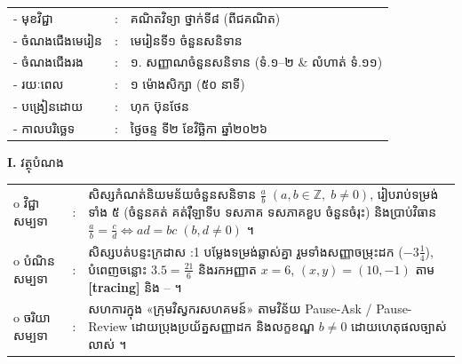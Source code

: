 \documentclass[a4paper,10pt]{article}
\newcommand{\wcirc}{{\CourierBullet\fontsize{9.5pt}{11pt}\selectfont o}}
\newcommand{\en}[1]{{\TimesEn #1}}
\newcommand{\cnum}[1]{\mbox{\fontsize{10.5pt}{12pt}\selectfont\ding{\numexpr181+#1\relax}}\hspace{0.15em}}
\begin{document}
{\renewcommand{\arraystretch}{1.06}
\hspace*{4.2cm}%
\begin{tabular}{@{}l l l@{}}
  - \hspace{0.35cm} មុខវិជ្ជា & : & គណិតវិទ្យា ថ្នាក់ទី៨ (ពីជគណិត) \\
  - \hspace{0.35cm} ចំណងជើងមេរៀន & : & មេរៀនទី១ ចំនួនសនិទាន \\
  - \hspace{0.35cm} ចំណងជើងរង & : & ១. សញ្ញាណចំនួនសនិទាន (ទំ.១--២ \& លំហាត់ ទំ.១១) \\
  - \hspace{0.35cm} រយៈពេល & : & ១ ម៉ោងសិក្សា (៥០ នាទី) \\
  - \hspace{0.35cm} បង្រៀនដោយ & : & ហុក ប៊ុនថែន \\
  - \hspace{0.35cm} កាលបរិច្ឆេទ & : & ថ្ងៃចន្ទ ទី២ ខែវិច្ឆិកា ឆ្នាំ២០២៦ \\
\end{tabular}

\vspace{2pt}

\textbf{I.} {\muol វត្ថុបំណង}\\[2pt]
\hspace*{0.55cm}%
\begin{tabular}{@{}l l L{14.0cm}@{}}
  \wcirc \hspace{0.25cm} វិជ្ជាសម្បទា & : & សិស្សកំណត់និយមន័យចំនួនសនិទាន $\frac{a}{b}\;(a,b\in\mathbb{Z},\; b\neq 0)$, រៀបរាប់ទម្រង់ទាំង ៥ (ចំនួនគត់ គត់រ៉ឺឡាទីប ទសភាគ ទសភាគខួប ចំនួនចំរុះ) និងប្រាប់វិធាន $\frac{a}{b}=\frac{c}{d} \Leftrightarrow ad=bc\;(b,d\neq 0)$ ។ \\
  \wcirc \hspace{0.25cm} បំណិនសម្បទា & : & សិស្សបត់បន្ទះក្រដាស \en{1:1} បម្លែងទម្រង់ឆ្លាស់គ្នា រួមទាំងសញ្ញាចម្រុះដក ($-3\frac{1}{4}$), បំពេញចន្លោះ $3.5=\frac{21}{6}$ និងរកអញ្ញាត $x=6$, $(x,y)=(10,-1)$ តាម \textbf{[tracing]} និង \cnum{1}--\cnum{5} ។ \\
  \wcirc \hspace{0.25cm} ចរិយាសម្បទា & : & សហការក្នុង «ក្រុមវិស្វករសហគមន៍» តាមវិន័យ \en{Pause-Ask / Pause-Review} ដោយប្រុងប្រយ័ត្នសញ្ញាដក និងលក្ខខណ្ឌ $b\neq 0$ ដោយហេតុផលច្បាស់លាស់ ។ \\
\end{tabular}

}
\end{document}
